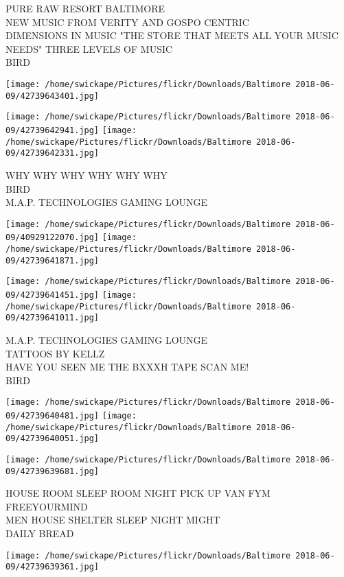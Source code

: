 \documentclass[10pt,letterpaper]{article}
\begin{document}
PURE RAW RESORT BALTIMORE\\
NEW MUSIC FROM VERITY AND GOSPO CENTRIC\\
DIMENSIONS IN MUSIC "THE STORE THAT MEETS ALL YOUR MUSIC NEEDS" THREE LEVELS OF MUSIC\\
BIRD
\pagebreak

\texttt{[image: /home/swickape/Pictures/flickr/Downloads/Baltimore 2018-06-09/42739643401.jpg]}

\vspace{0.25in}
\texttt{[image: /home/swickape/Pictures/flickr/Downloads/Baltimore 2018-06-09/42739642941.jpg]}
\texttt{[image: /home/swickape/Pictures/flickr/Downloads/Baltimore 2018-06-09/42739642331.jpg]}

WHY WHY WHY WHY WHY WHY\\
BIRD\\
M.A.P. TECHNOLOGIES GAMING LOUNGE
\pagebreak

\texttt{[image: /home/swickape/Pictures/flickr/Downloads/Baltimore 2018-06-09/40929122070.jpg]}
\texttt{[image: /home/swickape/Pictures/flickr/Downloads/Baltimore 2018-06-09/42739641871.jpg]}

\texttt{[image: /home/swickape/Pictures/flickr/Downloads/Baltimore 2018-06-09/42739641451.jpg]}
\texttt{[image: /home/swickape/Pictures/flickr/Downloads/Baltimore 2018-06-09/42739641011.jpg]}

M.A.P. TECHNOLOGIES GAMING LOUNGE\\
TATTOOS BY KELLZ\\
HAVE YOU SEEN ME THE BXXXH TAPE SCAN ME!\\
BIRD
\pagebreak

\texttt{[image: /home/swickape/Pictures/flickr/Downloads/Baltimore 2018-06-09/42739640481.jpg]}
\texttt{[image: /home/swickape/Pictures/flickr/Downloads/Baltimore 2018-06-09/42739640051.jpg]}

\texttt{[image: /home/swickape/Pictures/flickr/Downloads/Baltimore 2018-06-09/42739639681.jpg]}

HOUSE ROOM SLEEP ROOM NIGHT PICK UP VAN FYM FREEYOURMIND\\
MEN HOUSE SHELTER SLEEP NIGHT MIGHT\\
DAILY BREAD
\pagebreak

\texttt{[image: /home/swickape/Pictures/flickr/Downloads/Baltimore 2018-06-09/42739639361.jpg]}
\end{document}

